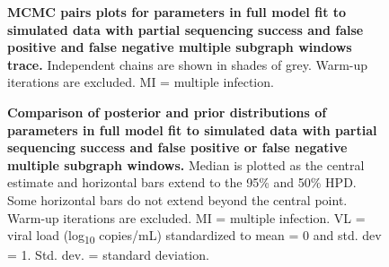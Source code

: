 \documentclass[10pt,letterpaper]{article}
\begin{document}
\begin{figure}[!ht]
\caption{{\bf MCMC pairs plots for parameters in full model fit to simulated data with partial sequencing success and false positive and false negative multiple subgraph windows trace.} Independent chains are shown in shades of grey. Warm-up iterations are excluded. MI = multiple infection.  }
\end{figure}

\begin{figure}[!ht]
\caption{{\bf Comparison of posterior and prior distributions of parameters in full model fit to simulated data with partial sequencing success and false positive or false negative multiple subgraph windows.} Median is plotted as the central estimate and horizontal bars extend to the 95\% and 50\% HPD. Some horizontal bars do not extend beyond the central point. Warm-up iterations are excluded. MI = multiple infection. VL = viral load (log\textsubscript{10} copies/mL) standardized to mean = 0 and std. dev = 1. Std. dev. = standard deviation. }
\end{figure}
\end{document}
